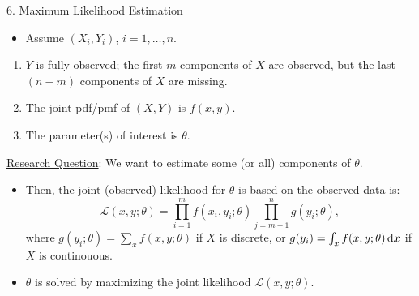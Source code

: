 \begin{Regular}{6. Maximum Likelihood Estimation}
    \begin{itemize}
        \item Assume $ (X_i,Y_i) $, $ i=1,\ldots,n $.
    \end{itemize}
    \begin{enumerate}[(1)]
        \item $ Y $ is fully observed; the first $ m $
              components of $ X $ are observed, but the last $ (n-m) $
              components of $ X $ are missing.
        \item The joint pdf/pmf of $ (X,Y) $ is $ f(x,y) $.
        \item The parameter(s) of interest is $ \theta $.
    \end{enumerate}
    \underline{Research Question}: We want to estimate some
    (or all) components of $ \theta $.
    \begin{itemize}
        \item Then, the joint (observed) likelihood for $ \theta $ is based on
              the observed data is:
              \begin{equation}
                  \mathcal{L}(x,y;\theta)
                  =\prod_{i=1}^{m}f(x_i,y_i;\theta)
                  \prod_{j=m+1}^{n}g(y_i;\theta),
              \end{equation}
              where $ g(y_i;\theta)=\sum_x f(x,y;\theta) $
              if $ X $ is discrete, or
              $ g(y_i)=\int_{x}f(x,y;\theta)\odif{x} $ if $ X $ is
              continouous.
        \item $ \theta $ is solved by maximizing the joint likelihood
              $ \mathcal{L}(x,y;\theta) $.
    \end{itemize}
\end{Regular}
